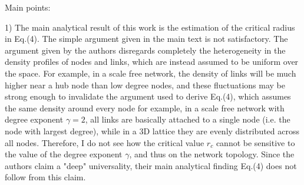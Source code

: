 \documentclass[11pt]{article}
\begin{document}
\noindent
Main points:
\begin{response}{
1) The main analytical result of this work is the estimation of the critical radius in Eq.(4). 
The simple argument given in the main text is not satisfactory. 
The argument given by the authors disregards completely the heterogeneity in the density profiles of nodes and links, which are instead assumed to be uniform over the space. 
For example, in a scale free network, the density of links will be much higher near a hub node than low degree nodes, and these fluctuations may be strong enough to invalidate the argument used to derive Eq.(4), which assumes the same density around every node for example, in a scale free network with degree exponent $\gamma=2$, all links are basically 
attached to a single node (i.e. the node with largest degree), while in a 3D lattice they are evenly distributed across all nodes. Therefore, I do not see how the critical value $r_c$ cannot be sensitive to the value of the degree exponent $\gamma$, and thus on the network topology. Since the authors claim a "deep" universality, their main analytical finding Eq.(4) does not follow from this claim.

}
\end{response}
\end{document}
